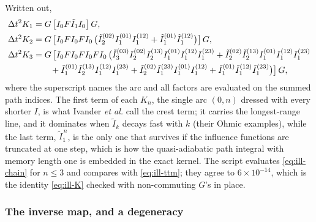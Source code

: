 Written out,
\begin{align}
  \Delta t^2K_1&=G\,\big[I_0F\tilde I_1I_0\big]\,G,\notag\\
  \Delta t^2K_2&=G\,\big[I_0FI_0FI_0\,\big(\tilde I_{2}^{(02)}I_1^{(01)}I_1^{(12)}+\tilde I_1^{(01)}\tilde I_1^{(12)}\big)\big]\,G,
  \label{eq:ill-K12}\\
  \Delta t^2K_3&=G\,\big[I_0FI_0FI_0FI_0\,\big(\tilde I_3^{(03)}I_2^{(02)}I_2^{(13)}I_1^{(01)}I_1^{(12)}I_1^{(23)}
  +\tilde I_2^{(02)}\tilde I_2^{(13)}I_1^{(01)}I_1^{(12)}I_1^{(23)}\notag\\
  &\qquad+\tilde I_1^{(01)}\tilde I_2^{(13)}I_1^{(12)}I_1^{(23)}+\tilde I_2^{(02)}\tilde I_1^{(23)}I_1^{(01)}I_1^{(12)}+\tilde I_1^{(01)}\tilde I_1^{(12)}\tilde I_1^{(23)}\big)\big]\,G,\notag
\end{align}
where the superscript names the arc and all factors are evaluated on the summed path indices.
The first term of each $K_n$, the single arc $(0,n)$ dressed with every shorter $I$, is what Ivander \emph{et al.} call the crest term; it carries the longest-range line, and it dominates when $\tilde I_k$ decays fast with $k$ (their Ohmic examples), while the last term, $\tilde I_1^{\,n}$, is the only one that survives if the influence functions are truncated at one step, which is how the quasi-adiabatic path integral with memory length one is embedded in the exact kernel.
The script evaluates \cref{eq:ill-chain} for $n\le3$ and compares with \cref{eq:ill-ttm}; they agree to $6\times10^{-14}$, which is the identity \eqref{eq:ill-K} checked with non-commuting $G$'s in place.

\subsubsection{The inverse map, and a degeneracy}

